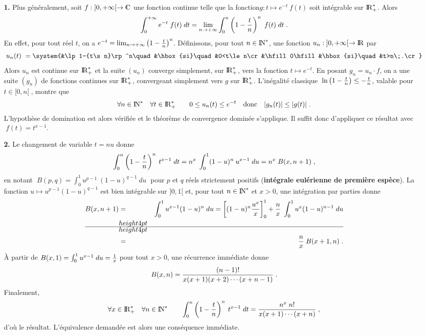 \documentclass{article}
\begin{document}
\msk
\cl{- - - - - - - - - - - - - - - - - - - - - - - - - - - - - -}
\msk

{\bf 1.} Plus g\'en\'eralement, soit $f:\;]0,\ii[\vers\cmat$ une fonction continue telle que la
fonction\break $g:t\mapsto e^{-t}\>f(t)$ soit int\'egrable sur ${\rm I\kern-0.6mm R}_+^*$. Alors\vv
$$\int_0^{+\infty}e^{-t}\;f(t)\;dt=\lim_{n\rightarrow+\infty}\int_0^n\left(1-{t\over n}\right)
^n\;f(t)\;dt\;.$$
En effet, pour tout r\'eel $t$, on a $e^{-t}=\lim_{n\rightarrow+\infty}
\left(1-{t\over n}\right)^n$. D\'efinissons, pour tout $n\in{\rm I\kern-0.5mm N}^*$, une
fonction $u_n:\;]0,+\infty[\rightarrow{\rm I\kern-0.6mm R}$ par\vv
$$u_n(t)\;=\system{&\lp1-{t\s n}\rp^n\quad&\hbox{si}\quad&0<t\le n\cr
                   &\hfill0\hfill         &\hbox{si}\quad&t>n\;.\cr}$$
Alors $u_n$ est continue sur ${\rm I\kern-0.6mm R}_+^*$ et la suite $(u_n)$ converge
simplement, sur ${\rm I\kern-0.6mm R}_+^*$, vers la fonction $t\mapsto e^{-t}$.\pn
En posant $g_n=u_n\cdot f$, on a une suite $(g_n)$ de fonctions continues
sur ${\rm I\kern-0.6mm R}_+^*$, convergeant simplement vers $g$ sur ${\rm I\kern-0.6mm R}_+^*$.
L'in\'egalit\'e classique $\;\ln\left(1-{t\over n}\right)\le-{t\over n}$, va\-lable pour
$t\in[0,n[\;$, montre que\vv
$$\forall n\in{\rm I\kern-0.5mm N}^*\quad\forall t\in{\rm I\kern-0.6mm R}_+^*\qquad 0\le u_n(t)\le e^{-t}\quad
\hbox{donc}\quad|g_n(t)|\le|g(t)|\;.$$
L'hypoth\`ese de domination est alors v\'erifi\'ee et le th\'eor\`eme de convergence
domin\'ee s'applique. Il suffit donc d'appliquer ce r\'esultat avec $\;f(t)=t^{x-1}$.

\msk
{\bf 2.} Le changement de variable $t=nu$ donne\vv
$$\int_0^n\left(1-{t\over n}\right)^n\>t^{x-1}\;dt =n^x\;\int_0^1(1-u)^n
                                                         \>u^{x-1}\;du
                                                    =n^x\;B(x,n+1)\;,$$
en notant $\;B(p,q)=\int_0^1u^{p-1}\>(1-u)^{q-1}\>du\;$ pour $p$ et $q$ r\'eels strictement positifs ({\bf int\'egrale eul\'erienne de premi\`ere esp\`ece}). La fonction $u\mapsto u^{p-1}(1-u)^{q-1}$
est bien int\'egrable sur $]0,1[$ et, pour tout $n\in{\rm I\kern-0.5mm N}^*$ et $x>0$, une int\'egration
par parties donne\vv
\begin{eqnarray*}
B(x,n+1) & = & \int_0^1u^{x-1}(1-u)^n\;du
                      =\lc(1-u)^n{u^x\s x}\rc_0^1+{n\s x}\;
                                 \int_0^1u^x(1-u)^{n-1}\;du\\
                    & = & {n\s x}\;B(x+1,n)\;.
\end{eqnarray*}
\`A partir de $B(x,1)=\int_0^1u^{x-1}\;du={1\over x}$ pour tout $x>0$, une
r\'ecurrence imm\'ediate donne
$$B(x,n)={(n-1)!\over x(x+1)(x+2)\cdots(x+n-1)}\;.$$
Finalement,\vv
$$\forall x\in{\rm I\kern-0.6mm R}_+^*\quad\forall n\in{\rm I\kern-0.5mm N}^*\qquad\int_0^n\left(1-{t\over n}\right)^n\>t^{x-1}\;dt={n^x\;n!\over x(x+1)\cdots(x+n)}\;,$$
d'o\`u le r\'esultat. L'\'equivalence demand\'ee est alors une cons\'equence imm\'ediate.
\end{document}
